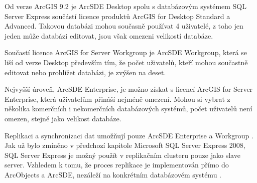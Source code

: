         Od verze ArcGIS 9.2 je ArcSDE Desktop spolu s databázovým systémem SQL Server Express součástí licence produktů ArcGIS for Desktop Standard a Advanced. Takovou databázi mohou současně používat 4 uživatelé, z toho jen jeden může databázi editovat, jsou však omezeni velikostí databáze.

Součastí licence ArcGIS for Server Workgroup je ArcSDE Workgroup, která se liší od verze Desktop především tím, že počet uživatelů, kteří mohou součastně editovat nebo prohlížet databázi, je zvýšen na deset.

Nejvyšší úroveň, ArcSDE Enterprise, je možno získat s licencí ArcGIS for Server Enterprise, která uživatelům přináší nejméně omezení. Mohou si vybrat z několika komerčních i nekomerčních databázových systémů, počet uživatelů není omezen, stejně jako velikost databáze.

Replikaci a synchronizaci dat umožňují pouze ArcSDE Enterprise a Workgroup \citep{Esri2013b}. Jak už bylo zmíněno v předchozí kapitole  Microsoft SQL Server Express 2008, SQL Server Express je možný použít v replikačním clusteru pouze jako slave server. Vzhledem k tomu, že proces replikace je implementován přímo do ArcObjects a ArcSDE, nezáleží na konkrétním databázovém systému \citep{Law2008}.
